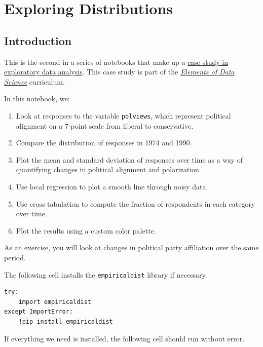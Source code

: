 \hypertarget{exploring-distributions}{%
\chapter{Exploring Distributions}\label{exploring-distributions}}

\hypertarget{introduction}{%
\section{Introduction}\label{introduction}}

This is the second in a series of notebooks that make up a
\href{https://allendowney.github.io/PoliticalAlignmentCaseStudy/}{case
study in exploratory data analysis}. This case study is part of the
\href{https://allendowney.github.io/ElementsOfDataScience/}{\emph{Elements
of Data Science}} curriculum.

In this notebook, we:

\begin{enumerate}
\def\labelenumi{\arabic{enumi}.}
\item
  Look at responses to the variable \passthrough{\lstinline!polviews!},
  which represent political alignment on a 7-point scale from liberal to
  conservative.
\item
  Compare the distribution of responses in 1974 and 1990.
\item
  Plot the mean and standard deviation of responses over time as a way
  of quantifying changes in political alignment and polarization.
\item
  Use local regression to plot a smooth line through noisy data.
\item
  Use cross tabulation to compute the fraction of respondents in each
  category over time.
\item
  Plot the results using a custom color palette.
\end{enumerate}

As an exercise, you will look at changes in political party affiliation
over the same period.

The following cell installs the \passthrough{\lstinline!empiricaldist!}
library if necessary.

\begin{lstlisting}[]
try:
    import empiricaldist
except ImportError:
    !pip install empiricaldist
\end{lstlisting}

If everything we need is installed, the following cell should run
without error.

